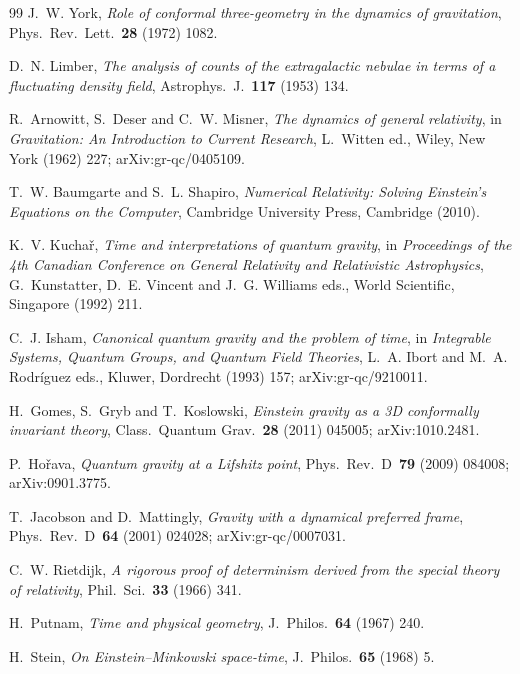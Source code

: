 \documentclass[11pt,a4paper]{article}
\begin{document}
\begin{thebibliography}{99}
J.~W. York,
\emph{Role of conformal three-geometry in the dynamics of gravitation},
Phys.~Rev.~Lett.~\textbf{28} (1972) 1082.

D.~N. Limber,
\emph{The analysis of counts of the extragalactic nebulae in terms of a fluctuating density field},
Astrophys.~J.~\textbf{117} (1953) 134.

R.~Arnowitt, S.~Deser and C.~W. Misner,
\emph{The dynamics of general relativity},
in \emph{Gravitation: An Introduction to Current Research}, L.~Witten ed., Wiley, New York (1962) 227; arXiv:gr-qc/0405109.

T.~W. Baumgarte and S.~L. Shapiro,
\emph{Numerical Relativity: Solving Einstein's Equations on the Computer},
Cambridge University Press, Cambridge (2010).

K.~V. Kucha\v{r},
\emph{Time and interpretations of quantum gravity},
in \emph{Proceedings of the 4th Canadian Conference on General Relativity and Relativistic Astrophysics}, G.~Kunstatter, D.~E. Vincent and J.~G. Williams eds., World Scientific, Singapore (1992) 211.

C.~J. Isham,
\emph{Canonical quantum gravity and the problem of time},
in \emph{Integrable Systems, Quantum Groups, and Quantum Field Theories}, L.~A. Ibort and M.~A. Rodr\'iguez eds., Kluwer, Dordrecht (1993) 157; arXiv:gr-qc/9210011.

H.~Gomes, S.~Gryb and T.~Koslowski,
\emph{Einstein gravity as a 3D conformally invariant theory},
Class.~Quantum Grav.~\textbf{28} (2011) 045005; arXiv:1010.2481.

P.~Ho\v{r}ava,
\emph{Quantum gravity at a Lifshitz point},
Phys.~Rev.~D~\textbf{79} (2009) 084008; arXiv:0901.3775.

T.~Jacobson and D.~Mattingly,
\emph{Gravity with a dynamical preferred frame},
Phys.~Rev.~D~\textbf{64} (2001) 024028; arXiv:gr-qc/0007031.

C.~W. Rietdijk,
\emph{A rigorous proof of determinism derived from the special theory of relativity},
Phil.~Sci.~\textbf{33} (1966) 341.

H.~Putnam,
\emph{Time and physical geometry},
J.~Philos.~\textbf{64} (1967) 240.

H.~Stein,
\emph{On Einstein--Minkowski space-time},
J.~Philos.~\textbf{65} (1968) 5.


\end{thebibliography}
\end{document}
